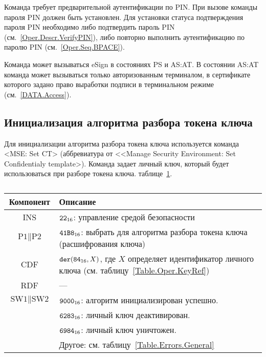 Команда требует предварительной аутентификации по PIN. 
При вызове команды  
пароля PIN должен быть установлен.
Для установки статуса подтверждения пароля PIN 
необходимо либо подтвердить пароль PIN (см.~\ref{Oper.Descr.VerifyPIN}), 
либо повторно выполнить аутентификацию по паролю PIN (см.~\ref{Oper.Seq.BPACE}).

Команда может вызываться  eSign в 
состояниях PS и AS:AT. В состоянии AS:AT команда 
может вызываться только авторизованным терминалом,
в сертификате которого задано право 
выработки подписи в терминальном режиме (см.~\ref{DATA.Access}).

\subsection{Инициализация алгоритма разбора токена ключа}
\label{Oper.Descr.SetCT}

Для инициализации алгоритма разбора токена ключа
используется команда <MSE: Set CT> 
(аббревиатура от <<Manage Security Environment: Set Confidentialy template>).
Команда задает личный ключ, который будет использоваться при разборе токена ключа.
 таблице~\ref{Table.Oper.SetCTCmd}.

\begin{table}[hbt]
\caption{}\label{Table.Oper.SetCTCmd}
\begin{tabular}{|c|p{14cm}|}
\hline
Компонент & Описание \\
\hline
\hline
INS & $\texttt{22}_{16}$: управление средой безопасности\\ 
\hline
$\text{P1} \parallel\text{P2}$ & $\texttt{41B8}_{16}$: 
выбрать для алгоритма разбора токена ключа
(расшифрования ключа) \\
\hline
CDF & 
$\texttt{der}(\texttt{84}_{16}, X)$, 
где $X$ определяет идентификатор личного ключа
(см. таблицу~\ref{Table.Oper.KeyRef})\\
\hline
RDF &  --- \\
\hline
$\text{SW1} \parallel \text{SW2}$ & 
$\texttt{9000}_{16}$: алгоритм инициализирован успешно. \\
  & $\texttt{6283}_{16}$: личный ключ деактивирован. \\
  & $\texttt{6984}_{16}$: личный ключ уничтожен. \\
  & Другое: см. таблицу~\ref{Table.Errors.General} \\
\hline
\end{tabular}
\end{table}

